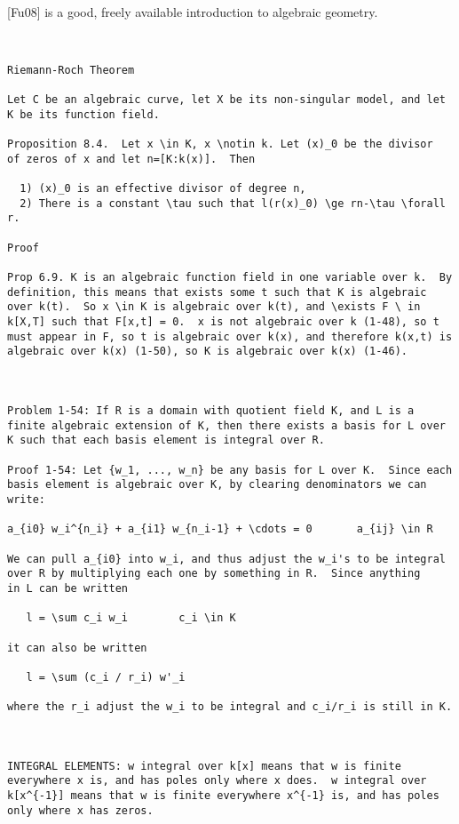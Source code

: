 \vfill\eject
{}

[Fu08] is a good, freely available introduction to algebraic geometry.

{\small\begin{verbatim}


Riemann-Roch Theorem

Let C be an algebraic curve, let X be its non-singular model, and let
K be its function field.

Proposition 8.4.  Let x \in K, x \notin k. Let (x)_0 be the divisor
of zeros of x and let n=[K:k(x)].  Then

  1) (x)_0 is an effective divisor of degree n,
  2) There is a constant \tau such that l(r(x)_0) \ge rn-\tau \forall r.

Proof

Prop 6.9. K is an algebraic function field in one variable over k.  By
definition, this means that exists some t such that K is algebraic
over k(t).  So x \in K is algebraic over k(t), and \exists F \ in
k[X,T] such that F[x,t] = 0.  x is not algebraic over k (1-48), so t
must appear in F, so t is algebraic over k(x), and therefore k(x,t) is
algebraic over k(x) (1-50), so K is algebraic over k(x) (1-46).



Problem 1-54: If R is a domain with quotient field K, and L is a
finite algebraic extension of K, then there exists a basis for L over
K such that each basis element is integral over R.

Proof 1-54: Let {w_1, ..., w_n} be any basis for L over K.  Since each
basis element is algebraic over K, by clearing denominators we can
write:

a_{i0} w_i^{n_i} + a_{i1} w_{n_i-1} + \cdots = 0       a_{ij} \in R

We can pull a_{i0} into w_i, and thus adjust the w_i's to be integral
over R by multiplying each one by something in R.  Since anything
in L can be written

   l = \sum c_i w_i        c_i \in K

it can also be written

   l = \sum (c_i / r_i) w'_i

where the r_i adjust the w_i to be integral and c_i/r_i is still in K.



INTEGRAL ELEMENTS: w integral over k[x] means that w is finite
everywhere x is, and has poles only where x does.  w integral over
k[x^{-1}] means that w is finite everywhere x^{-1} is, and has poles
only where x has zeros.


\end{verbatim}}
